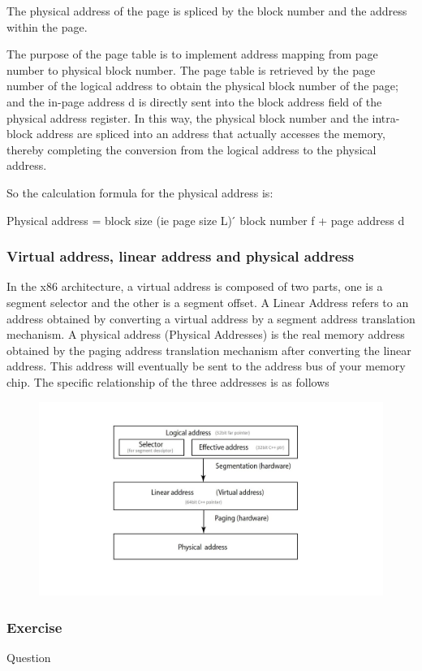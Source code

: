 The physical address of the page is spliced ​​by the block number and the address within the page.

The purpose of the page table is to implement address mapping from page number to physical block number. The page table is retrieved by the page number of the logical address to obtain the physical block number of the page; and the in-page address d is directly sent into the block address field of the physical address register. In this way, the physical block number and the intra-block address are spliced ​​into an address that actually accesses the memory, thereby completing the conversion from the logical address to the physical address.

So the calculation formula for the physical address is:

Physical address = block size (ie page size L) ́ block number f + page address d

\subsubsection{Virtual address, linear address and physical address}

In the x86 architecture, a virtual address is composed of two parts, one is a segment selector and the other is a segment offset. A Linear Address refers to an address obtained by converting a virtual address by a segment address translation mechanism. A physical address (Physical Addresses) is the real memory address obtained by the paging address translation mechanism after converting the linear address. This address will eventually be sent to the address bus of your memory chip. The specific relationship of the three addresses is as follows
\begin{figure}[H]
\centering
\includegraphics[width=0.8\linewidth]{figure/virtual_linear_physical_address}
\end{figure}

\subsubsection{Exercise }
\begin{flushleft}
{\Large Question}
\end{flushleft}

